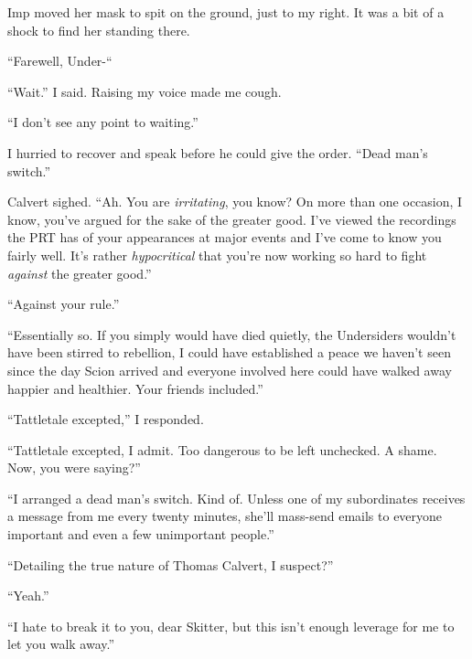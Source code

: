 Imp moved her mask to spit on the ground, just to my right.  It was a bit of a shock to find her standing there.



``Farewell, Under-``



``Wait.'' I said.  Raising my voice made me cough.



``I don't see any point to waiting.''



I hurried to recover and speak before he could give the order.  ``Dead man's switch.''



Calvert sighed.  ``Ah.  You are \emph{irritating}, you know?  On more than one occasion, I know, you've argued for the sake of the greater good.  I've viewed the recordings the PRT has of your appearances at major events and I've come to know you fairly well.  It's rather \emph{hypocritical} that you're now working so hard to fight \emph{against} the greater good.''



``Against your rule.''



``Essentially so.  If you simply would have died quietly, the Undersiders wouldn't have been stirred to rebellion, I could have established a peace we haven't seen since the day Scion arrived and everyone involved here could have walked away happier and healthier.  Your friends included.''



``Tattletale excepted,'' I responded.



``Tattletale excepted, I admit.  Too dangerous to be left unchecked.  A shame.  Now, you were saying?''



``I arranged a dead man's switch.  Kind of.  Unless one of my subordinates receives a message from me every twenty minutes, she'll mass-send emails to everyone important and even a few unimportant people.''



``Detailing the true nature of Thomas Calvert, I suspect?''



``Yeah.''



``I hate to break it to you, dear Skitter, but this isn't enough leverage for me to let you walk away.''



